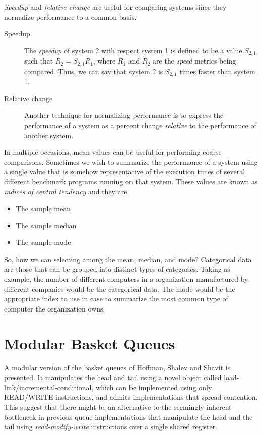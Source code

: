 \documentclass[openany, a4paper]{book}
\theoremstyle{break}
\theoremstyle{example}
\theoremstyle{note}
\theoremstyle{break}
\theoremstyle{exercise}
\begin{document}
\emph{Speedup} and \emph{relative change} are useful for comparing systems since they
normalize performance to a common basis.

\begin{description}
\item[{Speedup}] The \emph{speedup} of system 2 with respect system 1 is defined to be a
value \(S_{2,1}\) such that \(R_2 = S_{2,1}R_1\), where \(R_1\) and \(R_2\)
are the \emph{speed} metrics being compared. Thus, we can say that system 2 is
\(S_{2,1}\) times faster than system 1.
\item[{Relative change}] Another technique for normalizing performance is to
express the performance of a system as a percent change \emph{relative} to the
performance of another system.
\end{description}

In multiple occasions, mean values can be useful for performing coarse
comparisons. Sometimes we wish to summarize the performance of a system using
a single value that is somehow representative of the execution times of
several different benchmark programs running on that system. These values are
known as \emph{indices of central tendency} and they are:

\begin{itemize}
\item The sample mean
\item The sample median
\item The sample mode
\end{itemize}

So, how we can selecting among the mean, median, and mode? Categorical data
are those that can be grouped into distinct types of categories. Taking as
example, the number of different computers in a organization manufactured by
different companies would be the categorical data. The mode would be the
appropriate index to use in case to summarize the most common type of
computer the organization owns.

\chapter{Modular Basket Queues}
\label{sec:orgbec43c2}

A modular version of the basket queues of Hoffman, Shalev and Shavit is
presented. It manipulates the head and tail using a novel object called
load-link/incremental-conditional, which can be implemented using only
READ/WRITE instructions, and admits implementations that spread
contention. This suggest that there might be an alternative to the seemingly
inherent bottleneck in previous queue implementations that manipulate the head
and the tail using \emph{read-modify-write} instructions over a single shared
register.
\end{document}
